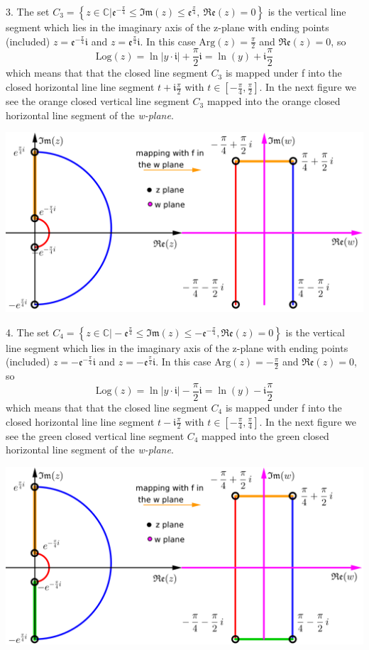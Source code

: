 \documentclass[10.5pt]{amsart}
\newcommand{\dsp}{\displaystyle}
\newcommand{\BBC}{\mathbb{C}}\newcommand{\mi}{\mathfrak{i}}
\begin{document}
3. The set $\dsp C_3=\left\{z\in\BBC\bigg|\mathfrak{e}^{-\frac{\pi}{4}}\leq\mathfrak{Im}(z)\leq\mathfrak{e}^{\frac{\pi}{4}}, \
\mathfrak{Re}(z)=0\right\}$ is the vertical line segment which lies in the imaginary axis of the z-plane with ending points (included)
$\dsp z=\mathfrak{e}^{-\frac{\pi}{4}}\mi$ and $z=\mathfrak{e}^{\frac{\pi}{4}}\mi$. In this case $\dsp\textrm{Arg}(z)=\frac{\pi}{2}$ and 
$\dsp\mathfrak{Re}(z)=0$, so \[\textrm{Log}(z)=\ln|y\cdot \mi|+\frac{\pi}{2}\mi=\ln⁡(y)+\mi\frac{\pi}{2}\] which means that that the 
closed line segment $C_3$ is mapped under f into the closed horizontal line line segment $\dsp t+\mi\frac{\pi}{2}$ with 
$t\in\left[-\frac{\pi}{4},\frac{\pi}{2}\right]$. In the next figure we see the orange closed vertical line segment $C_3$ mapped into the 
orange closed horizontal line segment of the \textit{w-plane}.
\begin{center}\includegraphics{2c.png}\end{center}
4.  The set $C_4=\left\{z\in\BBC\bigg|-\mathfrak{e}^{\frac{\pi}{4}}\leq\mathfrak{Im}(z)\leq-\mathfrak{e}^{-\frac{\pi}{4}}, \mathfrak{Re}(z)=0
\right\}$ is the vertical line segment which lies in the imaginary axis of the z-plane with ending points (included) 
$\dsp z=-\mathfrak{e}^{-\frac{\pi}{4}}\mi$ and $\dsp z=-\mathfrak{e}^{\frac{\pi}{4}}\mi$. In this case $\dsp\textrm{Arg}(z)=-\frac{\pi}{2}$ 
and $\dsp\mathfrak{Re}(z)=0$, so \[\textrm{Log}(z)=\ln|y\cdot \mi|−\frac{\pi}{2}\mi=\ln⁡(y)−\mi\frac{\pi}{2}\]
which means that that the closed line segment $C_4$ is mapped under f into the closed horizontal line line segment 
$\dsp t−\mi\frac{\pi}{2}$ with $t\in\left[-\frac{\pi}{4},\frac{\pi}{4}\right]$. In the next figure we see the green closed vertical line 
segment $C_4$ mapped into the green closed horizontal line segment of the \textit{w-plane}.
\begin{center}\includegraphics{2d.png}\end{center}
\end{document}
